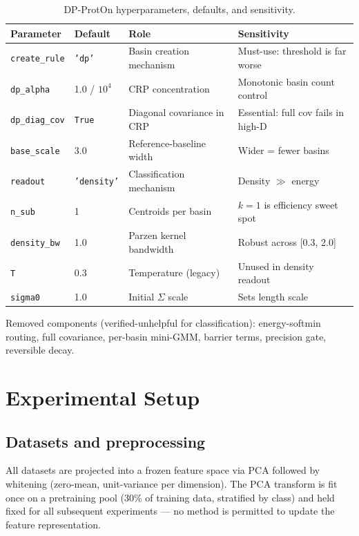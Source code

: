 \documentclass[11pt,a4paper]{article}
\begin{document}
\begin{table}[H]
\centering
\caption{DP-ProtOn hyperparameters, defaults, and sensitivity.}
\begin{tabular}{@{}llll@{}}
\toprule
Parameter & Default & Role & Sensitivity \\
\midrule
\texttt{create\_rule} & \texttt{'dp'} & Basin creation mechanism & Must-use: threshold is far worse \\
\texttt{dp\_alpha} & 1.0 / $10^4$ & CRP concentration & Monotonic basin count control \\
\texttt{dp\_diag\_cov} & \texttt{True} & Diagonal covariance in CRP & Essential: full cov fails in high-D \\
\texttt{base\_scale} & 3.0 & Reference-baseline width & Wider = fewer basins \\
\texttt{readout} & \texttt{'density'} & Classification mechanism & Density $\gg$ energy \\
\texttt{n\_sub} & 1 & Centroids per basin & $k{=}1$ is efficiency sweet spot \\
\texttt{density\_bw} & 1.0 & Parzen kernel bandwidth & Robust across [0.3, 2.0] \\
\texttt{T} & 0.3 & Temperature (legacy) & Unused in density readout \\
\texttt{sigma0} & 1.0 & Initial $\Sigma$ scale & Sets length scale \\
\bottomrule
\end{tabular}
\end{table}

Removed components (verified-unhelpful for classification): energy-softmin routing, full covariance, per-basin mini-GMM, barrier terms, precision gate, reversible decay.

\section{Experimental Setup}

\subsection{Datasets and preprocessing}

All datasets are projected into a frozen feature space via PCA followed by whitening (zero-mean, unit-variance per dimension). The PCA transform is fit once on a pretraining pool (30\% of training data, stratified by class) and held fixed for all subsequent experiments --- no method is permitted to update the feature representation.
\end{document}
